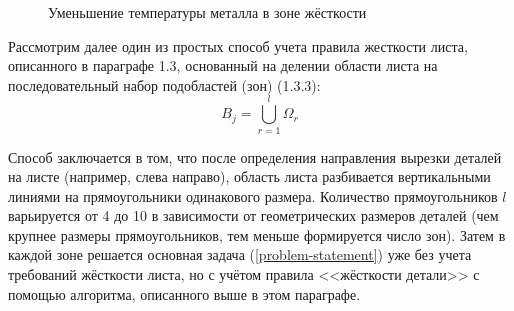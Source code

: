 \documentclass[11pt,twoside]{report}
\newcounter{lem}
\begin{document}
\begin{figure}
  \centering
  \caption{Уменьшение температуры металла в зоне жёсткости }
  \label{thermal-550-130}
\end{figure}



Рассмотрим далее один из простых способ учета правила жесткости листа,
описанного в параграфе 1.3,
основанный на делении области листа на
последовательный набор подобластей (зон) (1.3.3):
$$
B_j =
\bigcup_{r=1}^l \Omega_r
$$

Способ заключается в том,
что после определения направления вырезки деталей на листе
(например, слева направо),
область листа разбивается вертикальными линиями
на прямоугольники одинакового размера.
Количество прямоугольников $l$
варьируется от 4 до 10 в зависимости от
геометрических размеров деталей
(чем крупнее размеры прямоугольников,
тем меньше формируется число зон).
Затем в каждой зоне решается основная задача (\ref{problem-statement})
уже без учета требований жёсткости листа,
но с учётом правила <<жёсткости детали>>
с помощью  алгоритма, описанного выше в этом параграфе.
\end{document}
